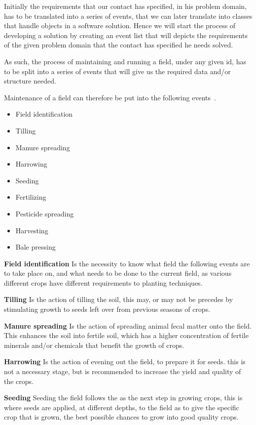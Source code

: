Initially the requirements that our contact has specified, in his problem domain, has to be translated into a series of events, that we can later translate into classes that handle objects in a software solution. Hence we will start the process of developing a solution by creating an event list that will depicts the requirements of the given problem domain that the contact has specified he needs solved.

As such, the process of maintaining and running a field, under any given id, has to be split into a series of events that will give us the required data and/or structure needed.

Maintenance of a field can therefore be put into the following events~\cite{lf:korndyrkelse}.

\begin{itemize}[noitemsep]
    \item Field identification
    \item Tilling
    \item Manure spreading
    \item Harrowing
    \item Seeding
    \item Fertilizing
    \item Pesticide spreading
    \item Harvesting
    \item Bale pressing
\end{itemize}

\textbf{Field identification} Is the necessity to know what field the following events are to take place on, and what needs to be done to the current field, as various different crops have different requirements to planting techniques.

\textbf{Tilling} Is the action of tilling the soil, this may, or may not be precedes by stimulating growth to seeds left over from previous seasons of crops.

\textbf{Manure spreading} Is the action of spreading animal fecal matter onto the field. This enhances the soil into fertile soil, which has a higher concentration of fertile minerals and/or chemicals that benefit the growth of crops.

\textbf{Harrowing} Is the action of evening out the field, to prepare it for seeds. this is not a necessary stage, but is recommended to increase the yield and quality of the crops.

\textbf{Seeding} Seeding the field follows the as the next step in growing crops, this is where seeds are applied, at different depths, to the field as to give the specific crop that is grown, the best possible chances to grow into good quality crops.

